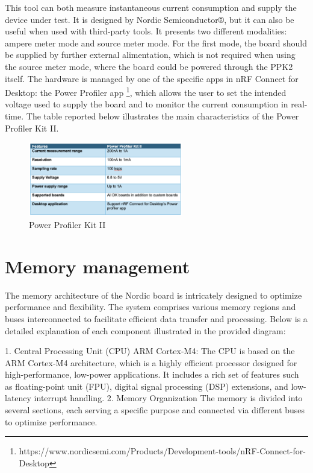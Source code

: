 \documentclass{Configuration_Files/PoliMi3i_thesis}
\begin{document}
This tool can both measure instantaneous current consumption and supply the device under test. It is designed by Nordic Semiconductor®, but it can also be useful when used with third-party tools. It presents two different modalities: ampere meter mode and source meter mode. For the first mode, the board should be supplied by further external alimentation, which is not required when using the source meter mode, where the board could be powered through the PPK2 itself. The hardware is managed by one of the specific apps in nRF Connect for Desktop: the Power Profiler app \footnote{https://www.nordicsemi.com/Products/Development-tools/nRF-Connect-for-Desktop}, which allows the user to set the intended voltage used to supply the board and to monitor the current consumption in real-time. The table reported below illustrates the main characteristics of the Power Profiler Kit II.

\begin{figure}[H]
    \centering
    \includegraphics[width=0.6\textwidth]{Materials/figure5}
    \caption{Power Profiler Kit II}
\end{figure}


\section{Memory management}

The memory architecture of the Nordic board is intricately designed to optimize performance and flexibility. The system comprises various memory regions and buses interconnected to facilitate efficient data transfer and processing. Below is a detailed explanation of each component illustrated in the provided diagram:

1. Central Processing Unit (CPU)
ARM Cortex-M4: The CPU is based on the ARM Cortex-M4 architecture, which is a highly efficient processor designed for high-performance, low-power applications. It includes a rich set of features such as floating-point unit (FPU), digital signal processing (DSP) extensions, and low-latency interrupt handling.
2. Memory Organization
The memory is divided into several sections, each serving a specific purpose and connected via different buses to optimize performance.
\end{document}
